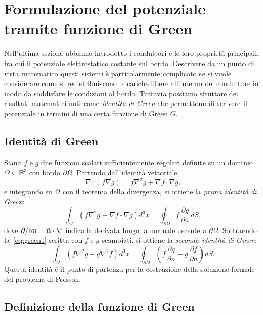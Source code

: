 \section{Formulazione del potenziale tramite funzione di Green}
Nell'ultima sezione abbiamo introdotto i conduttori e le loro proprietà principali, fra cui il potenziale elettrostatico costante sul bordo. Descrivere da 
un punto di vista matematico questi sistemi è particolarmente complicato se si vuole considerare come si redistribuiscono le cariche libere all'interno del 
conduttore in modo da soddisfare le condizioni al bordo. Tuttavia possiamo sfruttare dei risultati matematici noti come \textit{identità di Green} che 
permettono di scrivere il potenziale in termini di una certa funzione di Green $ G $.


\subsection{Identità di Green}

Siano $f$ e $g$ due funzioni scalari sufficientemente regolari definite su un dominio
$\Omega \subseteq \mathbb{R}^3$ con bordo $\partial\Omega$.
Partendo dall'identità vettoriale
\begin{equation}
    \nabla \cdot (f \nabla g) = f \nabla^2 g + \nabla f \cdot \nabla g,
\end{equation}
e integrando su $\Omega$ con il teorema della divergenza, si ottiene la
\emph{prima identità di Green}:
\begin{equation}\label{eq:green1}
    \int_\Omega \left( f \nabla^2 g + \nabla f \cdot \nabla g \right) d^3x
    = \oint_{\partial\Omega} f \, \frac{\partial g}{\partial n} \, dS,
\end{equation}
dove $\partial/\partial n = \hat{\mathbf{n}} \cdot \nabla$ indica la derivata lungo la
normale uscente a $\partial\Omega$.
Sottraendo la~\eqref{eq:green1} scritta con $f$ e $g$ scambiati, si ottiene la
\emph{seconda identità di Green}:
\begin{equation}\label{eq:green2}
    \int_\Omega \left( f \nabla^2 g - g \nabla^2 f \right) d^3x
    = \oint_{\partial\Omega} \left( f \, \frac{\partial g}{\partial n}
      - g \, \frac{\partial f}{\partial n} \right) dS.
\end{equation}
Questa identità è il punto di partenza per la costruzione della soluzione formale
del problema di Poisson.

\subsection{Definizione della funzione di Green}

